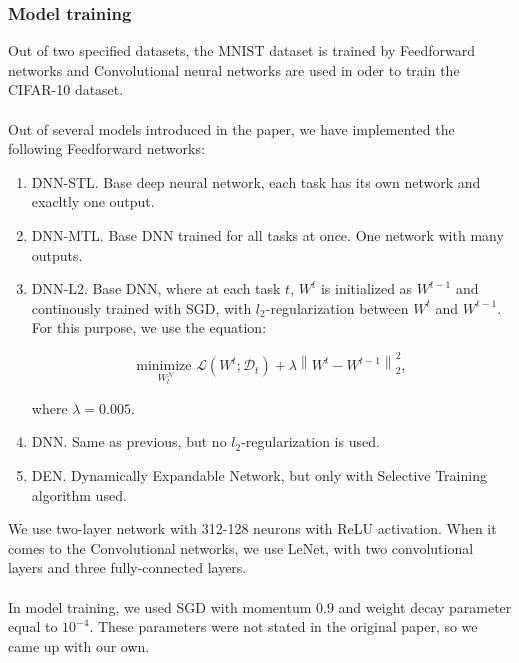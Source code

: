 \documentclass[12pt]{article}
\newcommand{\norm}[1]{\left\lVert#1\right\rVert}
\begin{document}
    \subsubsection{Model training}
    Out of two specified datasets, the MNIST dataset is trained by Feedforward networks and Convolutional
    neural networks are used in oder to train the CIFAR-10 dataset.
    \\
    \\
    Out of several models introduced in the paper, we have implemented the following Feedforward networks:
    \begin{enumerate}  
        \item DNN-STL. Base deep neural network, each task has its own network and exacltly one output.
        \item DNN-MTL. Base DNN trained for all tasks at once. One network with many outputs.
        \item DNN-L2. Base DNN, where at each task $t$, $W^{t}$ is initialized as $W^{t-1}$ and continously
        trained with SGD, with $l_{2}$-regularization between $W^{t}$ and $W^{t-1}$. For this purpose, we use
        the equation:

        $$ \underset{W_{l}^{\mathcal{N}}}{\text{minimize }} \mathcal{L}(W^{t}; \mathcal{D}_{t}) + \lambda \norm{W^{t} - W^{t-1}}^{2}_{2}, $$

        where $\lambda = 0.005$.

        \item DNN. Same as previous, but no $l_{2}$-regularization is used.
        \item DEN. Dynamically Expandable Network, but only with Selective Training algorithm used.   
    \end{enumerate}
    \bigskip
    We use two-layer network with 312-128 neurons with ReLU activation.
    When it comes to the Convolutional networks, we use LeNet, with two convolutional layers
    and three fully-connected layers.
    \\
    \\
    In model training, we used SGD with momentum $0.9$ and weight decay parameter equal to $10^{-4}$.
    These parameters were not stated in the original paper, so we came up with our own.
    
\end{document}
